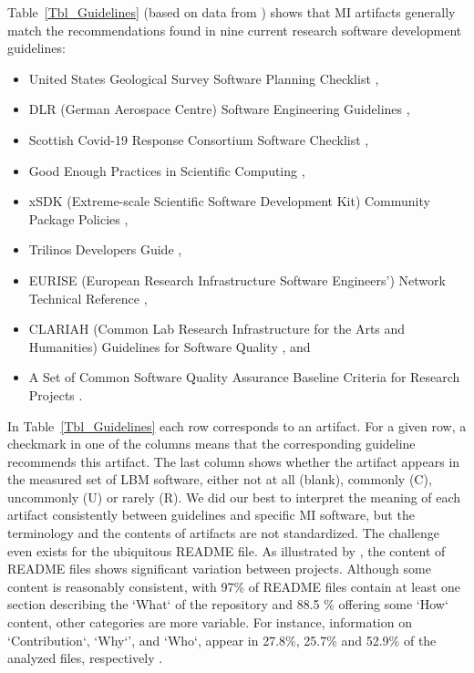 \documentclass[final, 3p, times, authoryear]{elsarticle}
\begin{document}
Table~\ref{Tbl_Guidelines} (based on data from \citep{SmithAndMichalski2022})
shows that MI artifacts generally match the recommendations found in nine
current research software development guidelines:
\begin{itemize}
\item United States Geological Survey Software Planning Checklist
\citep{USGS2019},
\item DLR (German Aerospace Centre) Software Engineering Guidelines
\citep{TobiasEtAl2018}, 
\item Scottish Covid-19 Response Consortium Software Checklist
\citep{BrettEtAl2021},
\item Good Enough Practices in Scientific Computing \citep{WilsonEtAl2016},
\item xSDK (Extreme-scale Scientific Software Development Kit) Community Package
Policies \citep{SmithAndRoscoe2018},
\item Trilinos Developers Guide \citep{HerouxEtAl2008},
\item EURISE (European Research Infrastructure Software Engineers') Network
Technical Reference \citep{ThielEtAl2020},
\item CLARIAH (Common Lab Research Infrastructure for the Arts and Humanities)
Guidelines for Software Quality \citep{vanGompelEtAl2016}, and
\item A Set of Common Software Quality Assurance Baseline Criteria for Research
Projects \citep{OrvizEtAl2017}.
\end{itemize}

In Table~\ref{Tbl_Guidelines} each row corresponds to an artifact.  For a given
row, a checkmark in one of the columns means that the corresponding guideline
recommends this artifact.  The last column shows whether the artifact appears in
the measured set of LBM software, either not at all (blank), commonly (C),
uncommonly (U) or rarely (R).  We did our best to interpret the meaning of each
artifact consistently between guidelines and specific MI software, but the
terminology and the contents of artifacts are not standardized.  The challenge
even exists for the ubiquitous README file.  As illustrated by
\citet{PranaEtAl2018}, the content of README files shows significant variation
between projects.  Although some content is reasonably consistent, with 97\% of
README files contain at least one section describing the `What` of the
repository and 88.5 \% offering some `How` content, other categories are more
variable.  For instance, information on `Contribution`, `Why`', and `Who`,
appear in 27.8\%, 25.7\% and 52.9\% of the analyzed files, respectively
\citep{PranaEtAl2018}.  
\end{document}
